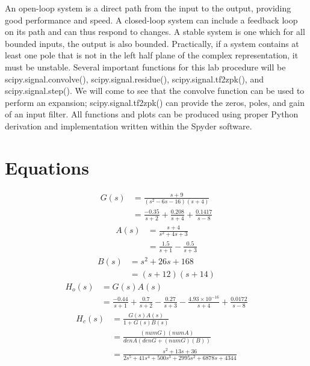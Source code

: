 \documentclass[12pt]{report}
\begin{document}
An open-loop system is a direct path from the input to the output, providing good performance and speed. A closed-loop system can include a feedback loop on its path and can thus respond to changes. A stable system is one which for all bounded inputs, the output is also bounded. Practically, if a system contains at least one pole that is not in the left half plane of the complex representation, it must be unstable. Several important functions for this lab procedure will be scipy.signal.convolve(), scipy.signal.residue(), scipy.signal.tf2zpk(), and scipy.signal.step(). We will come to see that the convolve function can be used to perform an expansion; scipy.signal.tf2zpk() can provide the zeros, poles, and gain of an input filter. All functions and plots can be produced using proper Python derivation and implementation written within the Spyder software. \\
	
\section{Equations}
	
\begin{align}
	G(s) &= \frac{s + 9}{(s^2 - 6s - 16)(s + 4)} \\
	&= \frac{-0.35}{s + 2} + \frac{0.208}{s + 4} + \frac{0.1417}{s - 8} \nonumber
\end{align}
\begin{align}
	A(s) &= \frac{s + 4}{s^2 + 4s + 3} \\
	&= \frac{1.5}{s + 1} - \frac{0.5}{s + 3} \nonumber
\end{align}
\begin{align}
	B(s) &= s^2 + 26s + 168 \\
	&= (s + 12)(s + 14) \nonumber
\end{align}
\begin{align}
	H_o(s) &= G(s)A(s) \\
	&= \frac{-0.44}{s + 1} + \frac{0.7}{s + 2} - \frac{0.27}{s + 3} - \frac{4.93 \times 10^{-16}}{s + 4} + \frac{0.0172}{s - 8} \nonumber
\end{align}
\begin{align}
	H_c(s) &= \frac{G(s)A(s)}{1 + G(s)B(s)} \\
	&= \frac{(numG)(numA)}{denA(denG + (numG)(B))} \\
	&= \frac{s^2 + 13s + 36}{2s^5 + 41s^4 + 500s^3 + 2995s^2 + 6878s + 4344} \nonumber
\end{align} \\
\end{document}
